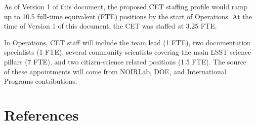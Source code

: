 \documentclass[DM,lsstdraft,toc]{lsstdoc}
\begin{document}
As of Version 1 of this document, the proposed CET staffing profile would ramp up to 10.5 full-time equivalent (FTE) positions by the start of Operations.
At the time of Version 1 of this document, the CET was staffed at 3.25 FTE.

In Operations, CET staff will include the team lead (1 FTE), two documentation specialists (1 FTE), several community scientists covering the main LSST science pillars (7 FTE), and two citizen-science related positions (1.5 FTE). 
The source of these appointments will come from NOIRLab, DOE, and International Programs contributions.



\appendix
\section{References} \label{sec:bib}
\renewcommand{\refname}{} %


%
\end{document}
